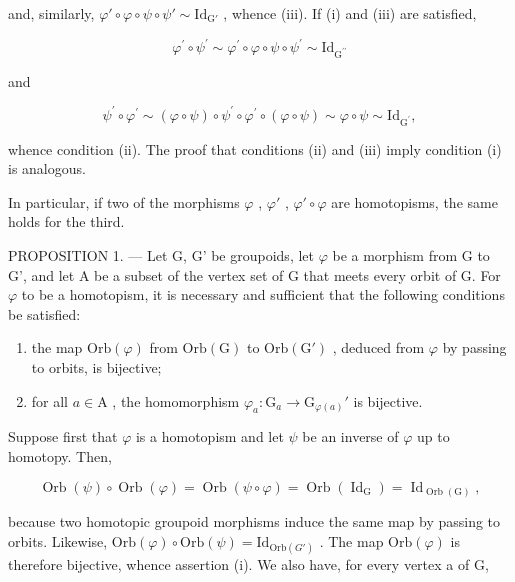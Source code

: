 and, similarly, \(\varphi' \circ \varphi \circ \psi \circ \psi' \sim \mathrm{Id}_{\mathrm{G}'}\) , whence (iii). If (i) and (iii) are satisfied,

\[
\varphi^ {\prime} \circ \psi^ {\prime} \sim \varphi^ {\prime} \circ \varphi \circ \psi \circ \psi^ {\prime} \sim \mathrm{Id} _ {\mathrm{G} ^ {\prime \prime}}
\]

and

\[
\psi^ {\prime} \circ \varphi^ {\prime} \sim (\varphi \circ \psi) \circ \psi^ {\prime} \circ \varphi^ {\prime} \circ (\varphi \circ \psi) \sim \varphi \circ \psi \sim \mathrm{Id} _ {\mathrm{G} ^ {\prime}},
\]

whence condition (ii). The proof that conditions (ii) and (iii) imply condition (i) is analogous.

In particular, if two of the morphisms \(\varphi\) , \(\varphi'\) , \(\varphi'\circ\varphi\) are homotopisms, the same holds for the third.

PROPOSITION 1. --- Let G, G' be groupoids, let \(\varphi\) be a morphism from G to G', and let A be a subset of the vertex set of G that meets every orbit of G. For \(\varphi\) to be a homotopism, it is necessary and sufficient that the following conditions be satisfied:

\begin{enumerate}
\def\labelenumi{(\roman{enumi})}
\item
  the map \(\mathrm{Orb}(\varphi)\) from \(\mathrm{Orb}(\mathrm{G})\) to \(\mathrm{Orb}(\mathrm{G}')\) , deduced from \(\varphi\) by passing to orbits, is bijective;
\item
  for all \(a \in \mathrm{A}\) , the homomorphism \(\varphi_a \colon \mathrm{G}_a \to \mathrm{G}_{\varphi(a)}'\) is bijective.
\end{enumerate}

Suppose first that \(\varphi\) is a homotopism and let \(\psi\) be an inverse of \(\varphi\) up to homotopy. Then,

\[
\operatorname{Orb} (\psi) \circ \operatorname{Orb} (\varphi) = \operatorname{Orb} (\psi \circ \varphi) = \operatorname{Orb} (\operatorname{Id} _ {\mathrm{G}}) = \operatorname{Id} _ {\operatorname{Orb} (\mathrm{G})},
\]

because two homotopic groupoid morphisms induce the same map by passing to orbits. Likewise, \(\mathrm{Orb}(\varphi) \circ \mathrm{Orb}(\psi) = \mathrm{Id}_{\mathrm{Orb}(G')}\) . The map \(\mathrm{Orb}(\varphi)\) is therefore bijective, whence assertion (i). We also have, for every vertex a of G,

